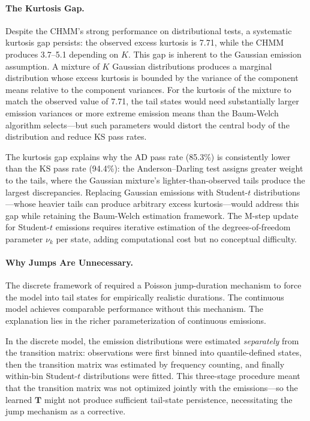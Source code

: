 \paragraph{The Kurtosis Gap.}
Despite the CHMM's strong performance on distributional tests, a systematic kurtosis gap persists: the observed excess kurtosis is 7.71, while the CHMM produces 3.7--5.1 depending on $K$.
This gap is inherent to the Gaussian emission assumption.
A mixture of $K$ Gaussian distributions produces a marginal distribution whose excess kurtosis is bounded by the variance of the component means relative to the component variances.
For the kurtosis of the mixture to match the observed value of 7.71, the tail states would need substantially larger emission variances or more extreme emission means than the Baum-Welch algorithm selects---but such parameters would distort the central body of the distribution and reduce KS pass rates.

The kurtosis gap explains why the AD pass rate (85.3\%) is consistently lower than the KS pass rate (94.4\%): the Anderson--Darling test assigns greater weight to the tails, where the Gaussian mixture's lighter-than-observed tails produce the largest discrepancies.
Replacing Gaussian emissions with Student-$t$ distributions---whose heavier tails can produce arbitrary excess kurtosis---would address this gap while retaining the Baum-Welch estimation framework.
The M-step update for Student-$t$ emissions requires iterative estimation of the degrees-of-freedom parameter $\nu_k$ per state, adding computational cost but no conceptual difficulty.

\paragraph{Why Jumps Are Unnecessary.}
The discrete framework of \citet{alswaidan2026hybrid} required a Poisson jump-duration mechanism to force the model into tail states for empirically realistic durations.
The continuous model achieves comparable performance without this mechanism.
The explanation lies in the richer parameterization of continuous emissions.

In the discrete model, the emission distributions were estimated \emph{separately} from the transition matrix: observations were first binned into quantile-defined states, then the transition matrix was estimated by frequency counting, and finally within-bin Student-$t$ distributions were fitted.
This three-stage procedure meant that the transition matrix was not optimized jointly with the emissions---so the learned $\mathbf{T}$ might not produce sufficient tail-state persistence, necessitating the jump mechanism as a corrective.

